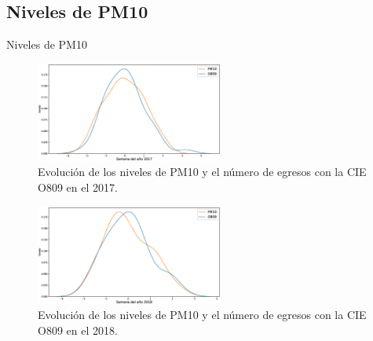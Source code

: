 \documentclass[11pt]{beamer}
\begin{document}
\subsection{Niveles de PM10}
\begin{frame}{Niveles de PM10}
\begin{multicols}{2}
\begin{figure}[!h]
\begin{center}
   \includegraphics[trim=100 0 0 0,clip,width=0.55\textwidth]{PM10_O809_2017.eps}
   \end{center}
    \caption[Series de tiempo 2017 PM10 y O809]{Evolución de los niveles de PM10 y el número de egresos con la CIE O809 en el 2017.}
    \label{serie_de_tiempo_2017_PM10}
\end{figure}
\begin{figure}[h!]
\begin{center}
   \includegraphics[trim=100 0 0 0,clip,width=0.55\textwidth]{PM10_O809_2018.eps}
   \end{center}
    \caption[Series de tiempo 2018 PM10 y O809]{Evolución de los niveles de PM10 y el número de egresos con la CIE O809 en el 2018.}
    \label{serie_de_tiempo_2018_PM10}
\end{figure}
\end{multicols}
\end{frame}
\end{document}
